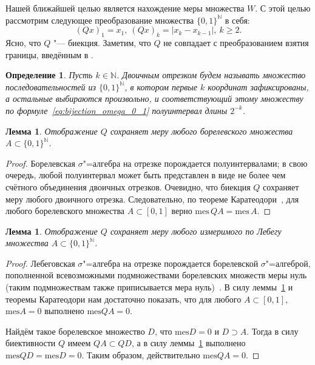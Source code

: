 \documentclass[12pt]{article}
\newtheorem{lem}[thm]{Лемма}
\newtheorem{dfn}[thm]{Определение}
\def\N{{\mathbb{N}}}
\def\mes{{\mathrm{mes}}}
\begin{document}
Нашей ближайшей целью является нахождение меры множества $W$. С этой целью рассмотрим следующее преобразование множества $\{0,1\}^\N$ в себя:
$$(Qx)_1=x_1, \ (Qx)_k=|x_k-x_{k-1}|, \ k\ge2.$$
Ясно, что $Q$ "--- биекция.
Заметим, что $Q$ не совпадает с преобразованием взятия границы, введённым в \cite{keller1992invariant}.

\begin{dfn}
	Пусть $k\in\mathbb{N}$.
	Двоичным отрезком будем называть множество последовательностей из $\{0,1\}^\N$,
	в котором первые $k$ координат зафиксированы, а остальные выбираются произвольно,
	и соответствующий этому множеству по формуле~\eqref{eq:bijection_omega_0_1} полуинтервал длины $2^{-k}$.
\end{dfn}



\begin{lem}\label{lem:Q_Borel}
	Отображение $Q$ сохраняет меру любого борелевского множества $A\subset \{0,1\}^\N$.
\end{lem}

\begin{proof}
	Борелевская $\sigma$"=алгебра на отрезке порождается полуинтервалами;
	в свою очередь, любой полуинтервал может быть представлен в виде не более чем счётного объединения двоичных отрезков.
	Очевидно, что биекция $Q$ сохраняет меру любого двоичного отрезка.
	Следовательно, по теореме Каратеодори~\cite[теорема 1.53]{klenke2013probability}, для любого борелевского множества $A\subset [0,1]$ верно
	$\mes \, QA = \mes \, A$.
\end{proof}

\begin{lem}\label{lem:Q_Lebesgue}
	Отображение $Q$ сохраняет меру любого измеримого по Лебегу множества $A\subset \{0,1\}^\N$.
\end{lem}

\begin{proof}
	Лебеговская $\sigma$"=алгебра на отрезке порождается борелевской $\sigma$"=алгеброй,
	пополненной всевозможными подмножествами борелевских множеств меры нуль
	(таким подмножествам также приписывается мера нуль)~\cite[пример 1.71]{klenke2013probability}.
	В силу леммы~\ref{lem:Q_Borel} и теоремы Каратеодори нам достаточно показать,
	что для любого $A\subset[0,1]$, $\mes A = 0$ выполнено $\mes QA = 0$.

	Найдём такое борелевское множество $D$, что $\mes D = 0$ и $D\supset A$.
	Тогда в силу биективности $Q$ имеем $QA \subset QD$, а в силу леммы~\ref{lem:Q_Borel} выполнено $\mes QD = \mes D = 0$.
	Таким образом, действительно $\mes QA = 0$.
\end{proof}
\end{document}

